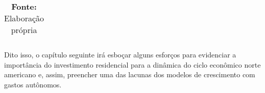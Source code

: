 \begin{table}[htb]
{\begin{tabular}{|l|ccccl|}
		\end{tabular}%
	}
\caption*{\textbf{Fonte:} Elaboração própria}
\end{table}



  Dito isso,  o capítulo seguinte irá esboçar alguns esforços para evidenciar a importância do investimento residencial para a dinâmica do ciclo econômico norte americano e, assim, preencher uma das lacunas dos modelos de crescimento com gastos autônomos.






